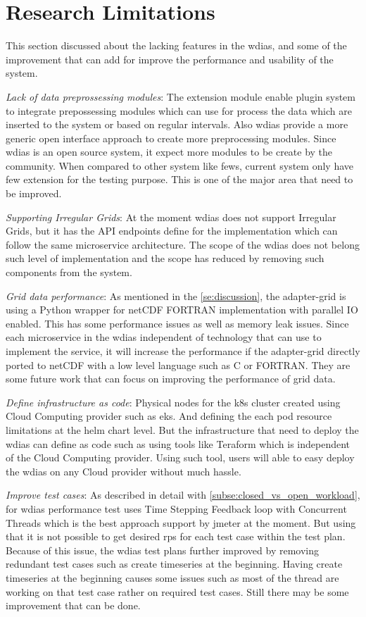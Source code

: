 \section{Research Limitations}
This section discussed about the lacking features in the \acrshort{wdias}, and some of the improvement that can add for improve the performance and usability of the system.

\emph{Lack of data preprossessing modules}:
The extension module enable plugin system to integrate prepossessing modules which can use for process the data which are inserted to the system or based on regular intervals. Also \acrshort{wdias} provide a more generic open interface approach to create more preprocessing modules. Since \acrshort{wdias} is an open source system, it expect more modules to be create by the community. When compared to other system like \acrshort{fews}, current system only have few extension for the testing purpose. This is one of the major area that need to be improved.

\emph{Supporting Irregular Grids}:
At the moment \acrshort{wdias} does not support Irregular Grids, but it has the API endpoints define for the implementation which can follow the same microservice architecture. The scope of the \acrshort{wdias} does not belong such level of implementation and the scope has reduced by removing such components from the system.

\emph{Grid data performance}:
As mentioned in the \cref{se:discussion}, the adapter-grid is using a Python wrapper for netCDF FORTRAN implementation with parallel IO enabled. This has some performance issues as well as memory leak issues. Since each microservice in the \acrshort{wdias} independent of technology that can use to implement the service, it will increase the performance if the adapter-grid directly ported to netCDF with a low level language such as C or FORTRAN. They are some future work that can focus on improving the performance of grid data.

\emph{Define infrastructure as code}:
Physical nodes for the \acrshort{k8s} cluster created using Cloud Computing provider such as \acrshort{eks}. And defining the each pod resource limitations at the helm chart level. But the infrastructure that need to deploy the \acrshort{wdias} can define as code such as using tools like Teraform which is independent of the Cloud Computing provider. Using such tool, users will able to easy deploy the \acrshort{wdias} on any Cloud provider without much hassle.

\emph{Improve test cases}:
As described in detail with \cref{subse:closed_vs_open_workload}, for \acrshort{wdias} performance test uses Time Stepping Feedback loop with Concurrent Threads which is the best approach support by \acrshort{jmeter} at the moment. But using that it is not possible to get desired \acrshort{rps} for each test case within the test plan.
Because of this issue, the \acrshort{wdias} test plans further improved by removing redundant test cases such as create timeseries at the beginning. Having create timeseries at the beginning causes some issues such as most of the thread are working on that test case rather on required test cases. Still there may be some improvement that can be done. 

